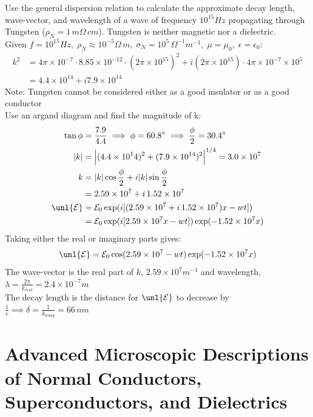 \documentclass[a4paper, 11pt, normalem]{report}
\newcommand\E{\mathcal{E}}
\newcommand\uE{\unl{\E}}
\newcommand\eno{\epsilon_0}
\newcommand\e{\epsilon}
\newcommand\lam{\lambda}
\begin{document}
\begin{example}
Use the general dispersion relation to calculate the approximate decay length, wave-vector, and wavelength of a wave of frequency $10^{15}Hz$ propagating through Tungsten ($\rho_N = 1\,m\Omega\,cm$).
Tungsten is neither magnetic nor a dielectric. \\
Given $f = 10^{15}Hz,\;\rho_N \approx 10^{-5}\Omega\,m,\;\sigma_N = 10^5\,\Omega^{-1}m^{-1},\;\mu=\mu_0,\;\e=\eno$:
\begin{align*}
    k^2 &= 4\pi\times10^{-7}\cdot8.85\times10^{-12}\cdot(2\pi\times10^{15})^2 + i(2\pi\times10^{15})\cdot4\pi\times10^{-7}\times10^5 \\
    &= 4.4\times10^{14} + i7.9\times10^{14}
\end{align*}
Note: Tungsten cannot be considered either as a good insulator or as a good conductor \\
Use an argand diagram and find the magnitude of k:
\begin{align*}
    \tan\phi &= \frac{7.9}{4.4} \implies \phi = 60.8^\circ \implies \frac{\phi}{2} = 30.4^\circ \\
    |k| &= \Big|(4.4\times10^14)^2 + (7.9\times10^{14})^2\Big|^{1/4} = 3.0\times10^7 \\
    k &= |k|\cos\frac{\phi}{2} + i|k|\sin\frac{\phi}{2} \\
    &= 2.59\times10^7 + i\,1.52\times10^7 \\
    \uE &= \E_0 \exp(i[(2.59\times10^7 + i\,1.52\times10^7)x - wt]) \\
    &= \E_0 \exp(i[2.59\times10^7x - wt])\exp(-1.52\times10^7x)
\end{align*}
Taking either the real or imaginary parts gives:
\begin{equation*}
    \uE = \E_0 \cos(2.59\times10^7 - wt)\exp(-1.52\times10^7x)
\end{equation*}
The wave-vector is the real part of $k$, $2.59\times10^7m^{-1}$ and wavelength, $\lam = \frac{2\pi}{k_{real}} = 2.4\times10^{-7}m$ \\
The decay length is the distance for $\uE$ to decrease by $\frac{1}{e} \implies \delta = \frac{1}{k_{imag}} = 66\,nm$
\end{example}

\section{Advanced Microscopic Descriptions of Normal Conductors, Superconductors, and Dielectrics}
\end{document}
